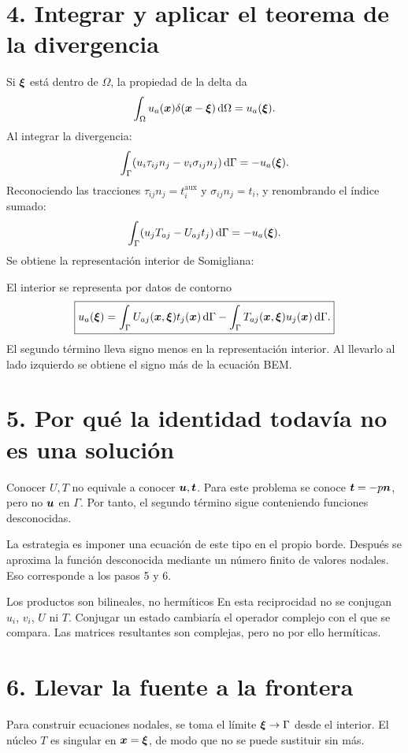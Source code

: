 \documentclass[11pt]{article}
\begin{document}
\newpage
\section*{4. Integrar y aplicar el teorema de la divergencia}
Si \(\bm{\xi}\) está dentro de \(\Omega\), la propiedad de la delta da
\[
 \int_\Omega u_a(\bm{x})\delta(\bm{x}-\bm{\xi})\,\mathrm{d}\Omega
 =u_a(\bm{\xi}).
\]
Al integrar la divergencia:
\[
 \int_\Gamma(u_i\tau_{ij}n_j-v_i\sigma_{ij}n_j)\,\mathrm{d}\Gamma
 =-u_a(\bm{\xi}).
\]
Reconociendo las tracciones \(\tau_{ij}n_j=t_i^{\mathrm{aux}}\) y
\(\sigma_{ij}n_j=t_i\), y renombrando el índice sumado:
\[
 \int_\Gamma(u_jT_{aj}-U_{aj}t_j)\,\mathrm{d}\Gamma=-u_a(\bm{\xi}).
\]
Se obtiene la representación interior de Somigliana:
\begin{resultado}{El interior se representa por datos de contorno}
\[
 \boxed{u_a(\bm{\xi})=
 \int_\Gamma U_{aj}(\bm{x},\bm{\xi})t_j(\bm{x})\,\mathrm{d}\Gamma
 -\int_\Gamma T_{aj}(\bm{x},\bm{\xi})u_j(\bm{x})\,\mathrm{d}\Gamma.}
\]
El segundo término lleva signo menos en la representación interior.
Al llevarlo al lado izquierdo se obtiene el signo más de la ecuación BEM.
\end{resultado}

\section*{5. Por qué la identidad todavía no es una solución}
Conocer \(U,T\) no equivale a conocer \(\bm{u},\bm{t}\). Para este problema
se conoce \(\bm{t}=-p\bm{n}\), pero no \(\bm{u}\) en \(\Gamma\).
Por tanto, el segundo término sigue conteniendo funciones desconocidas.

La estrategia es imponer una ecuación de este tipo en el propio borde.
Después se aproxima la función desconocida mediante un número finito de
valores nodales. Eso corresponde a los pasos 5 y 6.

\begin{alerta}{Los productos son bilineales, no hermíticos}
En esta reciprocidad no se conjugan \(u_i\), \(v_i\), \(U\) ni \(T\).
Conjugar un estado cambiaría el operador complejo con el que se compara.
Las matrices resultantes son complejas, pero no por ello hermíticas.
\end{alerta}

\newpage
\section*{6. Llevar la fuente a la frontera}
Para construir ecuaciones nodales, se toma el límite
\(\bm{\xi}\to\Gamma\) desde el interior. El núcleo \(T\) es singular en
\(\bm{x}=\bm{\xi}\), de modo que no se puede sustituir sin más.
\end{document}
